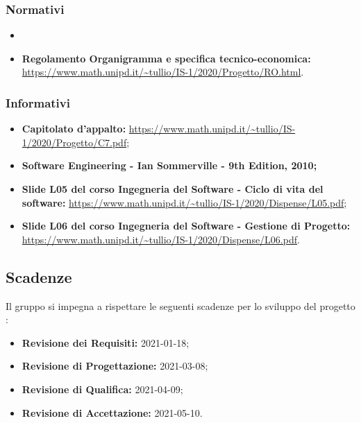 \subsubsection{Normativi}
\begin{itemize}
\item \NdP{}
\item \textbf{Regolamento Organigramma e specifica tecnico-economica:} \url{https://www.math.unipd.it/~tullio/IS-1/2020/Progetto/RO.html}.
\end{itemize}

\subsubsection{Informativi}
\begin{itemize}
\item \textbf{Capitolato d'appalto:} \url{https://www.math.unipd.it/~tullio/IS-1/2020/Progetto/C7.pdf};
\item\textbf{Software Engineering - Ian Sommerville - 9th Edition, 2010;}
\item \textbf{Slide L05 del corso Ingegneria del Software - Ciclo di vita del software:} \url{https://www.math.unipd.it/~tullio/IS-1/2020/Dispense/L05.pdf};
\item \textbf{Slide L06 del corso Ingegneria del Software - Gestione di Progetto:} \url{https://www.math.unipd.it/~tullio/IS-1/2020/Dispense/L06.pdf}.
\end{itemize}

\subsection{Scadenze}
Il gruppo \Gruppo si impegna a rispettare le seguenti scadenze per lo sviluppo del progetto \NomeProgetto:
\begin{itemize}
\item \textbf{Revisione dei Requisiti:} 2021-01-18;
\item \textbf{Revisione di Progettazione:} 2021-03-08;
\item \textbf{Revisione di Qualifica:} 2021-04-09;
\item \textbf{Revisione di Accettazione:} 2021-05-10.
\end{itemize}